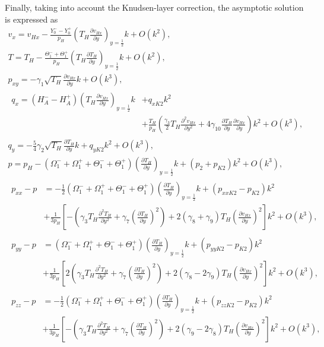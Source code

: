 \documentclass[review]{elsarticle}
\newcommand{\pder}[2][]{\frac{\partial#1}{\partial#2}}
\newcommand{\pderdual}[2][]{\frac{\partial^2#1}{\partial#2^2}}
\newcommand{\OO}[1]{O(#1)}
\begin{document}
Finally, taking into account the Knudsen-layer correction, the asymptotic solution is expressed as
\begin{gather}
    v_x = v_{Hx} - \frac{Y_0^--Y_0^+}{p_H}\left(T_H\pder[v_{Hx}]{y}\right)_{y=\frac12}k + \OO{k^2}, \label{eq:Hilbert_U}\\
    T = T_H - \frac{\Theta_1^-+\Theta_1^+}{p_H}\left(T_H\pder[T_H]{y}\right)_{y=\frac12}k + \OO{k^2}, \label{eq:Hilbert_T}\\
    p_{xy} = -\gamma_1\sqrt{T_H}\pder[v_{Hx}]{y}k + \OO{k^3}, \label{eq:Hilbert_Pxy}\\
    \begin{aligned}
        q_x = (H_A^--H_A^+)\left(T_H\pder[v_{Hx}]{y}\right)_{y=\frac12}k &+ q_{xK2}k^2 \\
        &+ \frac{T_H}{p_H}\left(\frac{\gamma_3}2 T_H \pderdual[v_{Hx}]{y}
        + 4\gamma_{10} \pder[T_H]{y}\pder[v_{Hx}]{y}\right)k^2 + \OO{k^3},
    \end{aligned}\label{eq:Hilbert_Qx}\\
    q_y = -\frac54\gamma_2\sqrt{T_H}\pder[T_H]{y}k + q_{yK2}k^2 + \OO{k^3}, \label{eq:Hilbert_Qy}\\
    p = p_H - (\Omega_1^-+\Omega_1^+ + \Theta_1^-+\Theta_1^+)\left(\pder[T_H]{y}\right)_{y=\frac12}k
        + (p_2 + p_{K2})k^2 + \OO{k^3}, \label{eq:Hilbert_p}\\
    \begin{aligned}
    p_{xx} - p &= -\frac12 (\Omega_1^-+\Omega_1^+ + \Theta_1^-+\Theta_1^+)\left(\pder[T_H]{y}\right)_{y=\frac12}k
        + (p_{xxK2}-p_{K2})k^2 \\
        &+ \frac1{3p_H}\left[-\left(\gamma_3 T_H \pderdual[T_H]{y} + \gamma_7\left(\pder[T_H]{y}\right)^2\right)
        + 2(\gamma_8+\gamma_9)T_H\left(\pder[v_{Hx}]{y}\right)^2\right]k^2 + \OO{k^3},
    \end{aligned}\label{eq:Hilbert_Pxx}\\
    \begin{aligned}
    p_{yy} - p &= (\Omega_1^-+\Omega_1^+ + \Theta_1^-+\Theta_1^+)\left(\pder[T_H]{y}\right)_{y=\frac12}k
        + (p_{yyK2}-p_{K2})k^2 \\
        &+ \frac1{3p_H}\left[2\left(\gamma_3 T_H \pderdual[T_H]{y} + \gamma_7\left(\pder[T_H]{y}\right)^2\right)
        + 2(\gamma_8-2\gamma_9)T_H\left(\pder[v_{Hx}]{y}\right)^2\right]k^2 + \OO{k^3},
    \end{aligned}\label{eq:Hilbert_Pyy}\\
    \begin{aligned}
    p_{zz} - p &= -\frac12 (\Omega_1^-+\Omega_1^+ + \Theta_1^-+\Theta_1^+)\left(\pder[T_H]{y}\right)_{y=\frac12}k
        + (p_{zzK2}-p_{K2})k^2 \\
        &+ \frac1{3p_H}\left[-\left(\gamma_3 T_H \pderdual[T_H]{y} + \gamma_7\left(\pder[T_H]{y}\right)^2\right)
        + 2(\gamma_9-2\gamma_8)T_H\left(\pder[v_{Hx}]{y}\right)^2\right]k^2 + \OO{k^3},
    \end{aligned}\label{eq:Hilbert_Pzz}
\end{gather}
\end{document}
